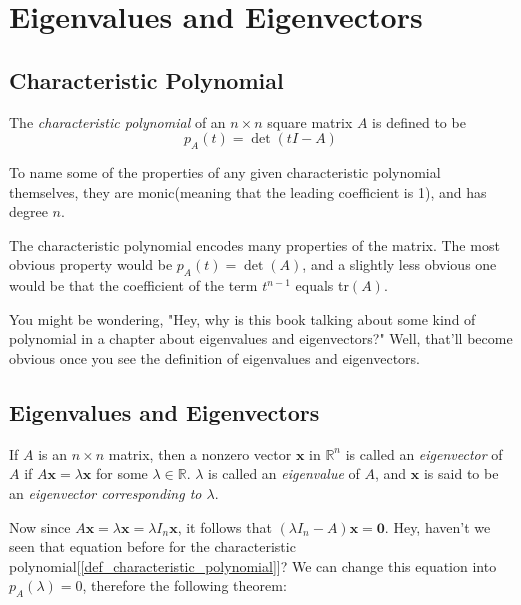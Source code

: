 \documentclass{report}
\begin{document}
	\section{Eigenvalues and Eigenvectors}
		\subsection{Characteristic Polynomial}
			\begin{defn}\label{def_characteristic_polynomial}
				The \emph{characteristic polynomial} of an $n \times n$ square matrix $A$ is defined to be
				\begin{displaymath}
					p_A(t)=\det(tI-A)
				\end{displaymath}
			\end{defn}
			To name some of the properties of any given characteristic polynomial themselves, they are monic(meaning that the leading coefficient is 1), and has degree $n$.
			
			The characteristic polynomial encodes many properties of the matrix. The most obvious property would be $p_A(t)=\det(A)$, and a slightly less obvious one would be that the coefficient of the term $t^{n-1}$ equals tr$(A)$.
			
			You might be wondering, "Hey, why is this book talking about some kind of polynomial in a chapter about eigenvalues and eigenvectors?" Well, that'll become obvious once you see the definition of eigenvalues and eigenvectors.
		
		\subsection{Eigenvalues and Eigenvectors}
		\begin{defn}
			If $A$ is an $n \times n$ matrix, then a nonzero vector $\bm{x}$ in $\mathbb{R}^n$ is called an \emph{eigenvector} of $A$ if $A\bm{x}=\lambda \bm{x}$ for some $\lambda \in \mathbb{R}$. $\lambda$ is called an \emph{eigenvalue} of $A$, and $\bm{x}$ is said to be an \emph{eigenvector corresponding to $\lambda$}.
		\end{defn}
		
		Now since $A\bm{x}=\lambda \bm{x}=\lambda I_n \bm{x}$, it follows that $(\lambda I_n - A)\bm{x}=\bm{0}$. Hey, haven't we seen that equation before for the characteristic polynomial[\ref{def_characteristic_polynomial}]? We can change this equation into $p_A(\lambda)=0$, therefore the following theorem:
		
\end{document}
